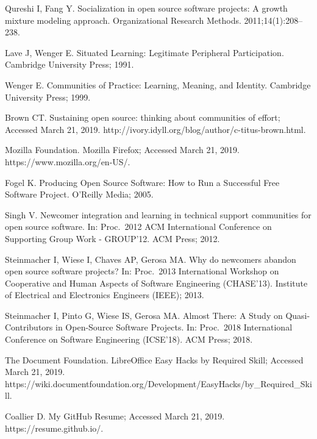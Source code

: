 \documentclass[10pt,letterpaper]{article}
\begin{document}
\begin{thebibliography}{10}

Qureshi I, Fang Y.
\newblock Socialization in open source software projects: A growth mixture
  modeling approach.
\newblock Organizational Research Methods. 2011;14(1):208--238.

Lave J, Wenger E.
\newblock Situated Learning: Legitimate Peripheral Participation.
\newblock Cambridge University Press; 1991.

Wenger E.
\newblock Communities of Practice: Learning, Meaning, and Identity.
\newblock Cambridge University Press; 1999.

Brown CT. Sustaining open source: thinking about communities of effort;
  Accessed March 21, 2019.
\newblock http://ivory.idyll.org/blog/author/c-titus-brown.html.

{Mozilla Foundation}. Mozilla Firefox; Accessed March 21, 2019.
\newblock https://www.mozilla.org/en-US/.

Fogel K.
\newblock Producing Open Source Software: How to Run a Successful Free Software
  Project.
\newblock O'Reilly Media; 2005.

Singh V.
\newblock Newcomer integration and learning in technical support communities
  for open source software.
\newblock In: Proc.\ 2012 {ACM} International Conference on Supporting Group
  Work - {GROUP'12}. {ACM} Press; 2012.

Steinmacher I, Wiese I, Chaves AP, Gerosa MA.
\newblock Why do newcomers abandon open source software projects?
\newblock In: Proc.\ 2013 International Workshop on Cooperative and Human
  Aspects of Software Engineering ({CHASE'13}). Institute of Electrical and
  Electronics Engineers ({IEEE}); 2013.

Steinmacher I, Pinto G, Wiese IS, Gerosa MA.
\newblock Almost There: A Study on Quasi-Contributors in Open-Source Software
  Projects.
\newblock In: Proc.\ 2018 International Conference on Software Engineering
  ({ICSE'18}). {ACM} Press; 2018.

{The Document Foundation}. LibreOffice Easy Hacks by Required Skill; Accessed
  March 21, 2019.
\newblock
  https://wiki.documentfoundation.org/Development/EasyHacks/by\_Required\_Skill.

Coallier D. My GitHub Resume; Accessed March 21, 2019.
\newblock https://resume.github.io/.


\end{thebibliography}
\end{document}
